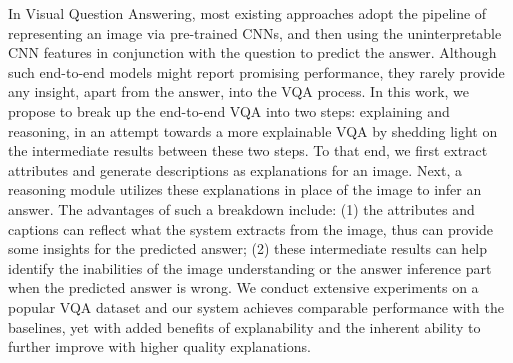 In Visual Question Answering, most existing approaches adopt the pipeline of representing an image via pre-trained CNNs, and then using the uninterpretable CNN features in conjunction with the question to predict the answer. Although such end-to-end models might report promising performance, they rarely provide any insight, apart from the answer, into the VQA process. In this work, we propose to break up the end-to-end VQA into two steps: explaining and reasoning, in an attempt towards a more explainable VQA by shedding light on the intermediate results between these two steps. To that end, we first extract attributes and generate descriptions as explanations for an image. Next, a reasoning module utilizes these explanations in place of the image to infer an answer. The advantages of such a breakdown include: (1) the attributes and captions can reflect what the system extracts from the image, thus can provide some insights for the predicted answer; (2) these intermediate results can help identify the inabilities of  the image understanding or the answer inference part when the predicted answer is wrong. We conduct extensive experiments on a popular VQA dataset and our system achieves comparable performance with the baselines, yet with added benefits of explanability and the inherent ability to further improve with higher quality explanations.
